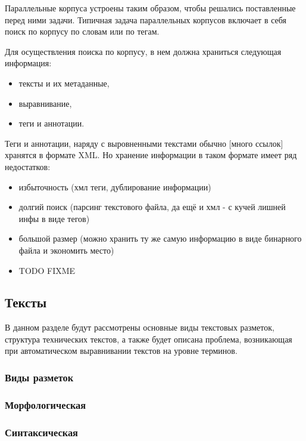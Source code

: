 Параллельные корпуса устроены таким образом, чтобы решались поставленные перед ними задачи.
Типичная задача параллельных корпусов включает в себя поиск по корпусу по словам или по тегам.

Для осуществления поиска по корпусу, в нем должна храниться следующая информация:
\begin{itemize}
    \item тексты и их метаданные,
    \item выравнивание,
    \item теги и аннотации.
\end{itemize}

Теги и аннотации, наряду с выровненными текстами обычно [много ссылок] хранятся в формате XML.
Но хранение информации в таком формате имеет ряд недостатков:
\begin{itemize}
    \item избыточность (хмл теги, дублирование информации)
    \item долгий поиск (парсинг текстового файла, да ещё и хмл - с кучей лишней инфы в виде тегов)
    \item большой размер (можно хранить ту же самую информацию в виде бинарного файла и экономить место)
    \item TODO FIXME
\end{itemize}

\subsection{Тексты}

В данном разделе будут рассмотрены основные виды текстовых разметок, структура технических текстов, а также будет описана проблема, возникающая при автоматическом выравнивании текстов на уровне терминов.

\subsubsection{Виды разметок}

\subsubsection*{Морфологическая}

\blindtext

\subsubsection*{Синтаксическая}

